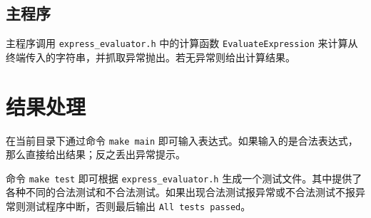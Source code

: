 \documentclass[UTF8]{ctexart}
\begin{document}
\subsection{主程序}

主程序调用 \verb|express_evaluator.h| 中的计算函数 \verb|EvaluateExpression| 来计算从终端传入的字符串，并抓取异常抛出。若无异常则给出计算结果。

\section{结果处理}

在当前目录下通过命令 \verb|make main| 即可输入表达式。如果输入的是合法表达式，那么直接给出结果；反之丢出异常提示。

命令 \verb|make test| 即可根据 \verb|express_evaluator.h| 生成一个测试文件。其中提供了各种不同的合法测试和不合法测试。如果出现合法测试报异常或不合法测试不报异常则测试程序中断，否则最后输出 \verb|All tests passed|。
\end{document}
